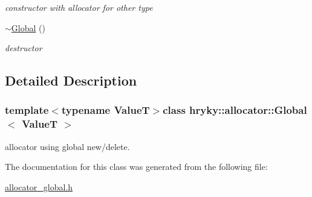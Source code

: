 \begin{DoxyCompactItemize}
\begin{DoxyCompactList}\small\item\em constructor with allocator for other type \end{DoxyCompactList}\item 
\hypertarget{classhryky_1_1allocator_1_1_global_a49d64e0ce4411a4f6241de0d18752a29}{\hyperlink{classhryky_1_1allocator_1_1_global_a49d64e0ce4411a4f6241de0d18752a29}{$\sim$\-Global} ()}\label{classhryky_1_1allocator_1_1_global_a49d64e0ce4411a4f6241de0d18752a29}

\begin{DoxyCompactList}\small\item\em destructor \end{DoxyCompactList}\end{DoxyCompactItemize}


\subsection{Detailed Description}
\subsubsection*{template$<$typename Value\-T$>$class hryky\-::allocator\-::\-Global$<$ Value\-T $>$}

allocator using global new/delete. 

The documentation for this class was generated from the following file\-:\begin{DoxyCompactItemize}
\item 
\hyperlink{allocator__global_8h}{allocator\-\_\-global.\-h}\end{DoxyCompactItemize}
